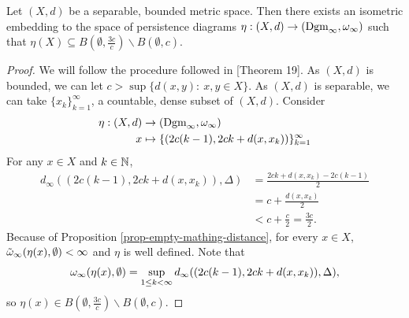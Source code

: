 \begin{theorem}
    Let $ (X, d) $ be a separable, bounded metric space. Then there exists an isometric embedding to the space of persistence diagrams $ \eta: (X, d) \to (\operatorname{Dgm}_\infty, \omega_\infty)$ such that $ \eta(X) \subseteq B(\emptyset, \frac{3c}{c}) \backslash B(\emptyset, c) $.
\end{theorem}

\begin{proof}
    We will follow the procedure followed in \cite{bubenik}[Theorem 19]. As $ (X, d) $ is bounded, we can let $ c > \sup \{d(x, y): \  x, y \in X\} $. As $ (X, d) $ is separable, we can take $ \{x_k\}_{k=1}^\infty $, a countable, dense subset of $ (X, d) $. Consider
    \begin{align*}
        \eta: (X, d) &\to (\operatorname{Dgm}_\infty, \omega_\infty) \\
        x &\mapsto \{(2c(k-1), 2ck + d(x, x_k))\}_{k=1}^\infty
    \end{align*}
    For any $ x \in X $ and $ k \in \mathbb N$,
    \begin{align*}
        d_\infty((2c(k-1), 2ck + d(x, x_k)), \Delta) 
        &= \frac{2ck + d(x, x_k) - 2c(k-1)}{2} \\
        &= c + \frac{d(x, x_k)}{2} \\
        &< c + \frac{c}{2} = \frac{3c}{2}.
    \end{align*}
    Because of Proposition \ref{prop-empty-mathing-distance}, for every $ x \in X $, $ \tilde \omega_\infty(\eta(x), \emptyset) < \infty $ and $ \eta $ is well defined. Note that
    \begin{align*}
        \omega_\infty(\eta(x), \emptyset) = \sup_{1 \leq k < \infty} d_\infty((2c(k-1), 2ck + d(x, x_k)), \Delta),
    \end{align*}
    so $ \eta(x) \in B(\emptyset, \frac{3c}{c}) \backslash B(\emptyset, c)$.


\end{proof}

